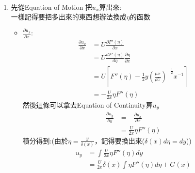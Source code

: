 \documentclass[../main.tex]{subfiles}
\begin{document}
\begin{itemize}
\begin{itemize}
\begin{enumerate}
    這個$\eta$如同similarity approach一樣，希望能是$x$與$y$的函數\\
    但因為$x,y$都是同樣單位，所以就沒必要做無因次化了\\
    由剛剛的Goldilocks Argument，可以猜測$\eta$的形式為:
    \begin{equation}
      \eta = \frac{y}{\delta(x)} = y\left(
        \frac{\mu x}{\rho U}
      \right)^{-\frac{1}{2}}
    \end{equation}
    定義: \label{sec:ch2_5_boundary_layer_dev_definition_F}
    \begin{equation}
      \frac{u_x}{U} = F'(\eta)
    \end{equation}
    這邊定義$F'(\eta)$是為了之後方便積分而已\\
    因為可以由Equation of Continuity，將$u_y$換成$u_x$的函數\\
    可是Equation of Continuity是說兩個變數的微分相同，所以定$F'(\eta)$會比較方便
    \item 先從Equation of Motion 把$u_x$算出來:\\
    一樣記得要把多出來的東西想辦法換成$\eta$的函數
    \begin{itemize}
      \item $\frac{\partial u_x}{\partial x}$:
      \begin{align}
        \frac{\partial u_x}{\partial x} &= U \frac{\partial F'(\eta)}{\partial x} \nonumber\\
        &= U \frac{d F'(\eta)}{d \eta} \frac{\partial \eta}{\partial x} \nonumber\\
        &= U \left[
          F''(\eta) - \frac{1}{2}y \left(
            \frac{\mu x}{\rho U}
          \right)^{-\frac{1}{2}}x^{-1}
        \right] \nonumber\\
        &= -\frac{U}{2x} \eta F''(\eta)
      \end{align}
      然後這條可以拿去Equation of Continuity算$u_y$
      \begin{align}
        \frac{\partial u_y}{\partial y} &= -\frac{\partial u_x}{\partial x} \nonumber\\
        &= \frac{U}{2x} \eta F''(\eta)
      \end{align}
      積分得到:(由於$\eta = \frac{y}{\delta(x)}$，記得要換出來($\delta(x)d\eta = dy$))
      \begin{align}
        u_y &= \int \frac{U}{2x} \eta F''(\eta) dy \nonumber\\
        &= \frac{U}{2x}\delta(x) \int \eta F''(\eta) d\eta + G(x) \nonumber\\

\end{align}
\end{itemize}
\end{enumerate}
\end{itemize}
\end{itemize}
\end{document}
